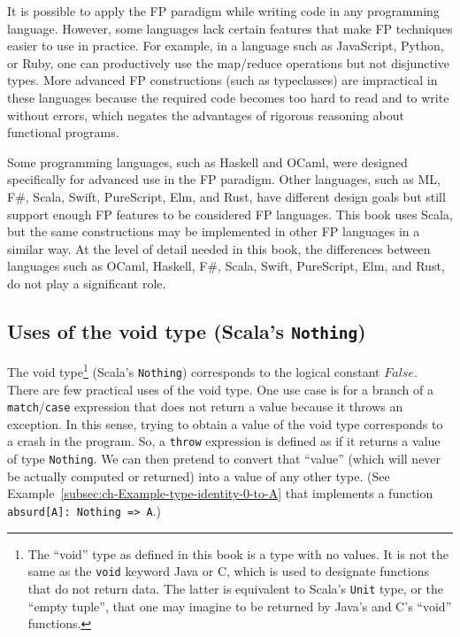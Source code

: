 It is possible to apply the FP paradigm while writing code in any
programming language. However, some languages lack certain features
that make FP techniques easier to use in practice. For example, in
a language such as JavaScript, Python, or Ruby, one can productively
use the map/reduce operations but not disjunctive types. More advanced
FP constructions (such as typeclasses) are impractical in these languages
because the required code becomes too hard to read and to write without
errors, which negates the advantages of rigorous reasoning about functional
programs.

Some programming languages, such as Haskell and OCaml, were designed
specifically for advanced use in the FP paradigm. Other languages,
such as ML, F\#, Scala, Swift, PureScript, Elm, and Rust, have different
design goals but still support enough FP features to be considered
FP languages. This book uses Scala, but the same constructions may
be implemented in other FP languages in a similar way. At the level
of detail needed in this book, the differences between languages such
as OCaml, Haskell, F\#, Scala, Swift, PureScript, Elm, and Rust, do
not play a significant role.

\subsection{Uses of the void type (Scala\textsf{'}s \texttt{Nothing})}

The void type\footnote{The \textsf{``}void\textsf{''} type as defined in this book is a type with no values.
It is not the same as the \lstinline!void! keyword Java or C, which
is used to designate functions that do not return data. The latter
is equivalent to Scala\textsf{'}s \lstinline!Unit! type, or the \textsf{``}empty tuple\textsf{''},
that one may imagine to be returned by Java\textsf{'}s and C\textsf{'}s \textsf{``}void\textsf{''} functions.} (Scala\textsf{'}s \lstinline!Nothing!) corresponds to the logical constant
$False$. There are few practical uses of the void type. One use case
is for a branch of a \lstinline!match!/\lstinline!case! expression
that does not return a value because it throws an exception.
In this sense, trying to obtain a value of the void type corresponds
to a crash in the program. So, a \lstinline!throw! expression is
defined as if it returns a value of type \lstinline!Nothing!. We
can then pretend to convert that \textsf{``}value\textsf{''} (which will never be
actually computed or returned) into a value of any other type. (See
Example~\ref{subsec:ch-Example-type-identity-0-to-A} that implements
a function \lstinline!absurd[A]: Nothing => A!.) 

